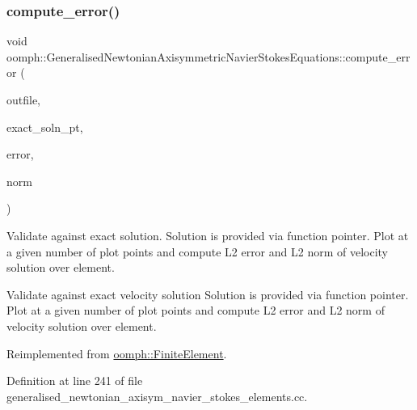 \mbox{\label{classoomph_1_1GeneralisedNewtonianAxisymmetricNavierStokesEquations_ab5def0480b0de42ba8c9f515c404d6af}} 
\subsubsection{\texorpdfstring{compute\+\_\+error()}{compute\_error()}\hspace{0.1cm}{\footnotesize\ttfamily [2/2]}}
{\footnotesize\ttfamily void oomph\+::\+Generalised\+Newtonian\+Axisymmetric\+Navier\+Stokes\+Equations\+::compute\+\_\+error (\begin{DoxyParamCaption}\item[{std\+::ostream \&}]{outfile,  }\item[{\hyperlink{classoomph_1_1FiniteElement_a690fd33af26cc3e84f39bba6d5a85202}{Finite\+Element\+::\+Steady\+Exact\+Solution\+Fct\+Pt}}]{exact\+\_\+soln\+\_\+pt,  }\item[{double \&}]{error,  }\item[{double \&}]{norm }\end{DoxyParamCaption})\hspace{0.3cm}{\ttfamily [virtual]}}



Validate against exact solution. Solution is provided via function pointer. Plot at a given number of plot points and compute L2 error and L2 norm of velocity solution over element. 

Validate against exact velocity solution Solution is provided via function pointer. Plot at a given number of plot points and compute L2 error and L2 norm of velocity solution over element. 

Reimplemented from \hyperlink{classoomph_1_1FiniteElement_a73c79a1f1e5b1d334757812a6bbd58ff}{oomph\+::\+Finite\+Element}.



Definition at line 241 of file generalised\+\_\+newtonian\+\_\+axisym\+\_\+navier\+\_\+stokes\+\_\+elements.\+cc.



